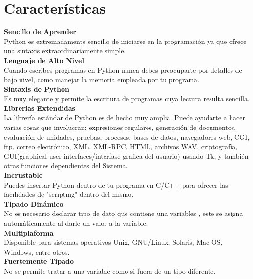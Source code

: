 \documentclass[11pt]{article} %
\begin{document}
\section{Características}

\textbf{Sencillo de Aprender}
\\    Python es extremadamente sencillo de iniciarse en la programación ya que ofrece una sintaxis extraordinariamente simple.\\

\textbf{Lenguaje de Alto Nivel}
\\    Cuando escribes programas en Python nunca debes preocuparte por detalles de bajo nivel, como manejar la memoria empleada por tu programa.\\

\textbf{Sintaxis de Python}
\\	  Es muy elegante y permite la escritura de programas cuya lectura resulta sencilla.\\

\textbf{Librerías Extendidas}
\\	  La librería estándar de Python es de hecho muy amplia. Puede ayudarte a hacer varias cosas que involucran: expresiones regulares, generación de documentos, evaluación de unidades, pruebas, procesos, bases de datos, navegadores web, CGI, ftp, correo electrónico, XML, XML-RPC, HTML, archivos WAV, criptografía, GUI(graphical user interfaces/interfase grafica del usuario) usando Tk, y también otras funciones dependientes del Sistema.\\

\textbf{Incrustable}
\\    Puedes insertar Python dentro de tu programa en C/C++ para ofrecer las facilidades de "scripting" dentro del mismo.\\

\textbf{Tipado Dinámico}
\\    No es necesario declarar tipo de dato que contiene una variables , este se asigna automáticamente al darle un valor a la variable.\\

\textbf{Multiplaforma}
\\   Disponible para sistemas operativos Unix, GNU/Linux, Solaris, Mac OS, Windows, entre otros.\\

\textbf{Fuertemente Tipado}
\\   No se permite tratar a una variable como si fuera de un tipo diferente.\\
\end{document}
